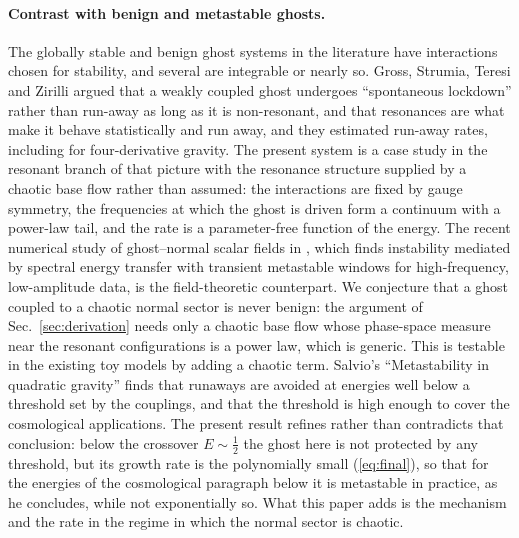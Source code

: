 \documentclass[11pt,a4paper]{article}
\begin{document}
\paragraph{Contrast with benign and metastable ghosts.} The globally stable and benign ghost
systems in the literature \cite{DMV22,DamourSmilga,Smilga} have interactions chosen for
stability, and several are integrable or nearly so. Gross, Strumia, Teresi and Zirilli
\cite{GSTZ21} argued that a weakly coupled ghost undergoes ``spontaneous lockdown'' rather than
run-away as long as it is non-resonant, and that resonances are what make it behave
statistically and run away, and they estimated run-away rates, including for four-derivative
gravity. The present system is a case study in the resonant branch of that picture with the
resonance structure supplied by a chaotic base flow rather than assumed: the interactions are
fixed by gauge symmetry, the frequencies at which the ghost is driven form a continuum with a
power-law tail, and the rate is a parameter-free function of the energy. The recent numerical
study of ghost--normal scalar fields in \cite{WOLK26}, which finds instability mediated by
spectral energy transfer with transient metastable windows for high-frequency, low-amplitude
data, is the field-theoretic counterpart. We conjecture that a ghost coupled to a chaotic normal
sector is never benign: the argument of Sec.~\ref{sec:derivation} needs only a chaotic base flow
whose phase-space measure near the resonant configurations is a power law, which is generic.
This is testable in the existing toy models by adding a chaotic term. Salvio's
``Metastability in quadratic gravity'' \cite{Salvio19} finds that runaways are avoided at
energies well below a threshold set by the couplings, and that the threshold is high enough to
cover the cosmological applications. The present result refines rather than contradicts that
conclusion: below the crossover $E\sim\tfrac12$ the ghost here is not protected by any
threshold, but its growth rate is the polynomially small (\ref{eq:final}), so that for the
energies of the cosmological paragraph below it is metastable in practice, as he concludes,
while not exponentially so. What this paper adds is the mechanism and the rate in the regime in
which the normal sector is chaotic.
\end{document}
